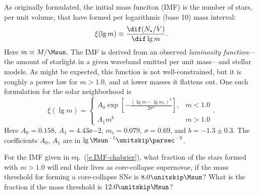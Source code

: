 As originally formulated\cite{Salpeter1955The-Luminosity-}, the initial mass funciton (IMF) is the number of stars, per unit volume, that have formed per logarithmic (base 10) mass interval:
\begin{equation}\label{e.IMF}
\xi(\lg m) \equiv \frac{\dif(N_{\star}/V)}{\dif\lg m}.
\end{equation}
Here $m \equiv M/\Msun$.
The IMF is derived from an observed \emph{luminosity function}---the amount of starlight in a given waveband emitted per unit mass---and stellar models.  As might be expected, this function is not well-constrained, but it is roughly a power law for $m > 1.0$, and at lower masses it flattens out. One such formulation\cite{Chabrier2003Galactic-Stella} for the solar neighborhood is
\begin{equation}\label{e.IMF-chabrier}
\xi(\lg m) = \left\{\begin{array}{lr}A_0\exp\left[-\frac{(\lg m - \lg m_c)^2}{2\sigma^2}\right], & m < 1.0 \\A_1 m^b & m > 1.0\end{array}\right. .
\end{equation}
Here $A_{0} = 0.158$, $A_{1} = 4.43\ee{-2}$, $m_{c} = 0.079$, $\sigma = 0.69$, and $b = -1.3\pm 0.3$.  The coefficients $A_{0}$, $A_{1}$ are in $\lg\Msun^{-1}\usp\parsec^{-3}$.

\begin{exercisebox}
 For the IMF given in eq.~(\ref{e.IMF-chabrier}), what fraction of the stars formed with $m > 1.0$ will end their lives as core-collapse supernovae, if the mass threshold for forming a core-collapse SNe is $8.0\nsp\Msun$?  What is the fraction if the mass threshold is $12.0\nsp\Msun$?
\end{exercisebox}

